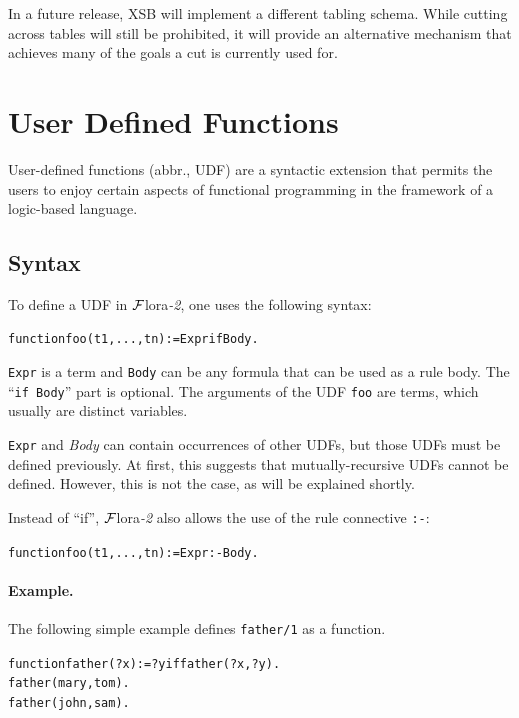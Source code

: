 \documentclass[11pt]{article}
\newcommand{\FLORA}{{\mbox{\sc ${\cal F}${lora}\rm\emph{-2}}}\xspace}
\begin{document}
In a future release, XSB will implement a different tabling schema. While
cutting across tables will still be prohibited, it will provide an
alternative mechanism that achieves many of the goals a cut is currently  used for.


\section{User Defined Functions} \label{sec:udf}


User-defined functions (abbr., UDF) are a syntactic extension that permits
the users to enjoy certain aspects of functional programming in the
framework of a logic-based language.
 

\subsection{Syntax}\label{sec-udf}
To define a UDF in
\FLORA, one uses the following syntax:

\begin{alltt}
    function foo(t1,...,tn) := Expr if Body.
\end{alltt}

\noindent
\texttt{Expr} is a term and \texttt{Body} can be any formula that can be
used as a rule body.
The ``\texttt{if Body}'' part is optional.
The arguments of the UDF \texttt{foo} are
terms, which usually are distinct variables.

\texttt{Expr} and \emph{Body} can contain occurrences of other UDFs, but those
UDFs must be defined previously. At first, this suggests that
mutually-recursive UDFs cannot be defined. However, this is not the case,
as will be explained shortly.

\medskip

\noindent
Instead of ``if'', \FLORA also allows the use of the rule connective
\texttt{:-}: 
\begin{alltt}
    function foo(t1,...,tn) := Expr :- Body.
\end{alltt}

\paragraph{Example.}
The following simple example defines \texttt{father/1} as a function.
\begin{alltt}
    function father(?x):=?y if father(?x,?y).
    father(mary,tom).
    father(john,sam).
\end{alltt}
\end{document}
